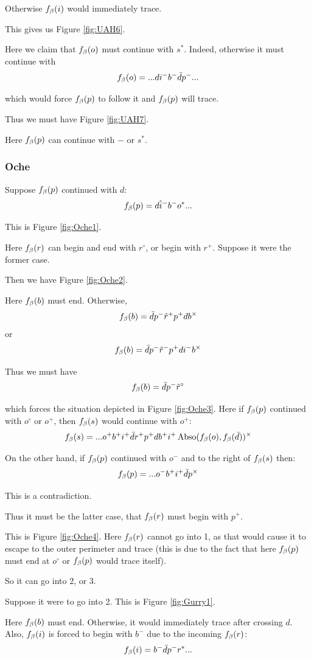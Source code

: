 Otherwise $f_\beta(i)$ would immediately trace.

This gives us Figure \ref{fig:UAH6}.

Here we claim that $f_\beta(o)$ must continue with $s^*$. Indeed, otherwise it must continue with
\[
f_\beta(o) = ...d i^- b^- \bar{d} p^-...
\]

which would force $f_\beta(p)$ to follow it and $f_\beta(p)$ will trace.

Thus we must have Figure \ref{fig:UAH7}. 

Here $f_\beta(p)$ can continue with $-$ or $s^*$.

\subsubsection{Oche}\label{Oche}
Suppose $f_\beta(p)$ continued with $d$:
\[
f_\beta(p) = d \hat{i}^- b^- o^*...
\]

This is Figure \ref{fig:Oche1}.

Here $f_\beta(r)$ can begin and end with $r^\circ$, or begin with $r^+$. Suppose it were the former case.

Then we have Figure \ref{fig:Oche2}.

Here $f_\beta(b)$ must end. Otherwise,
\[
f_\beta(b) = \bar{d} p^- \hat{r}^+ p^+ d b^\times
\]
or
\[
f_\beta(b) = \bar{d} p^- \hat{r}^- p^+ d i^- b^\times
\]

Thus we must have
\[
f_\beta(b) = \bar{d} p^- \hat{r}^\circ
\]

which forces the situation depicted in Figure \ref{fig:Oche3}. Here if $f_\beta(p)$ continued with $o^\circ$ or $o^+$, then $f_\beta(s)$ would continue with $o^+$:
\[
f_\beta(s) = ...o^+ b^+ i^+ \bar{d} r^+ p^+ d b^+ i^+ \operatorname{Abso}(f_\beta(o), f_\beta(\bar{d}))^\times
\]

On the other hand, if $f_\beta(p)$ continued with $o^-$ and to the right of $f_\beta(s)$ then:
\[
f_\beta(p) =...o^- b^+ i^+ \bar{d} p^\times
\]

This is a contradiction. 

Thus it must be the latter case, that $f_\beta(r)$ must begin with $p^+$.

This is Figure \ref{fig:Oche4}. Here $f_\beta(r)$ cannot go into 1, as that would cause it to escape to the outer perimeter and trace (this is due to the fact that here $f_\beta(p)$ must end at $o^\circ$ or $f_\beta(p)$ would trace itself).

So it can go into 2, or 3.

\label{Gurry}
Suppose it were to go into 2. This is Figure \ref{fig:Gurry1}.

Here $f_\beta(b)$ must end. Otherwise, it would immediately trace after crossing $d$. Also, $f_\beta(i)$ is forced to begin with $b^-$ due to the incoming $f_\beta(r)$:
\[
f_\beta(i) = b^- \bar{d} p^- r^*...
\]


